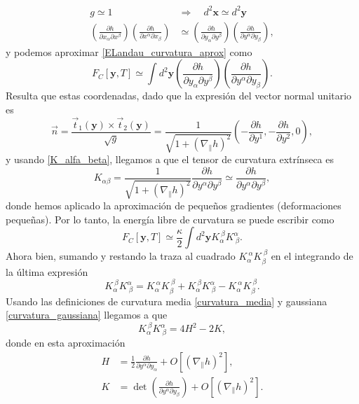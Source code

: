 \begin{align*}
g\simeq 1\quad&\Rightarrow\quad d^2\mathbf{x}\simeq d^2\mathbf{y}\\
\left(\frac{\partial h}{\partial x_{\alpha} \partial x^{\beta}}\right)
\left(\frac{\partial h}{\partial x^{\alpha} \partial x_{\beta}}\right)&\simeq \left(\frac{\partial h}{\partial y_{\alpha} \partial y^{\beta}}\right)
\left(\frac{\partial h}{\partial y^{\alpha} \partial y_{\beta}}\right) ,
\end{align*}
y podemos aproximar \eqref{ELandau_curvatura_aprox} como 
\begin{equation*}
F_C[\mathbf{y},T]\simeq\int d^2\mathbf{y} 
\left(\frac{\partial h}{\partial y_{\alpha} \partial y^{\beta}}\right)
\left(\frac{\partial h}{\partial y^{\alpha} \partial y_{\beta}}\right).
\end{equation*}
Resulta que estas coordenadas, dado que la expresión del vector normal
unitario es
\begin{equation*}
\vec{n}=\frac{\vec{t}_1(\mathbf{y})\times\vec{t}_2(\mathbf{y})}{\sqrt{g}}=\frac{1}{\sqrt{1+\left(\nabla_{\|} h\right)^2}} \left( -\frac{\partial h}{\partial y^1},-\frac{\partial h}{\partial y^2},0\right),
\end{equation*}
y usando \eqref{K_alfa_beta}, llegamos a que el tensor de curvatura extrínseca es
\begin{equation*}
K_{\alpha\beta}=\frac{1}{\sqrt{1+\left(\nabla_{\|} h\right)^2}}\frac{\partial h}{\partial
  y^{\alpha} \partial y^{\beta}}\simeq \frac{\partial h}{\partial
  y^{\alpha} \partial y^{\beta}},
\end{equation*}
donde hemos aplicado la aproximación de pequeños gradientes (deformaciones
pequeñas). Por lo tanto, la energía libre de curvatura \cite{Bowick:Membranes_review} se puede escribir como 
\begin{equation}\label{ELandau_curvatura1}
F_C[\mathbf{y},T]\simeq\frac{\kappa}{2}\int d^2\mathbf{y} K_{\alpha}^{\ \beta}K^{\alpha}_{\ \beta}.
\end{equation} 
Ahora bien, sumando y restando la traza al cuadrado $K_{\alpha}^{\
  \alpha}K_{\beta}^{\ \beta}$ en el integrando de la última expresión
\begin{equation*}
K_{\alpha}^{\ \beta}K^{\alpha}_{\ \beta}=K_{\alpha}^{\ \alpha}K_{\beta}^{\
  \beta}+K_{\alpha}^{\ \beta}K^{\alpha}_{\ \beta}-K_{\alpha}^{\ \alpha}K_{\beta}^{\ \beta}.
\end{equation*}
Usando las definiciones de curvatura media \eqref{curvatura_media} y
gaussiana \eqref{curvatura_gaussiana} llegamos a que
\begin{equation*}
K_{\alpha}^{\ \beta}K^{\alpha}_{\ \beta}=4H^2-2K,
\end{equation*} 
donde en esta aproximación
\begin{align*}
H&=\frac{1}{2}\frac{\partial h}{\partial y^{\alpha} \partial y_{\alpha}}+O\left[\left(\nabla_{\|} h\right)^2\right],\\
K&=\det \left(\frac{\partial h}{\partial y^{\alpha} \partial y_{\beta}}\right)+O\left[\left(\nabla_{\|} h\right)^2\right].
\end{align*}

